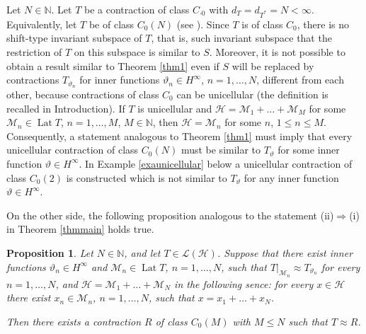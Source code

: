 \documentclass[a4paper,oneside,11pt]{amsart}
\numberwithin{equation}{section}
\theoremstyle{plain}
\newtheorem{proposition}[theorem]{Proposition}
\theoremstyle{definition}
\begin{document}
Let $N\in\mathbb N$. 
Let $T$ be a contraction of class  $C_{\cdot 0}$ with $d_T=d_{T^*}=N<\infty$. 
Equivalently, let $T$ be of class $C_0(N)$ (see \cite{sznf74}). 
Since $T$ is of class $C_0$, 
there is no shift-type invariant subspace of $T$, that is, such invariant subspace that the restriction of  $T$ on 
this subspace is similar to $S$. 
Moreover, it is not possible to obtain a result similar to Theorem \ref{thm1}  even if $S$ will be replaced by 
contractions $T_{\vartheta_n}$ for inner functions $\vartheta_n\in H^\infty$,   $n=1,\ldots, N$, different from each other, 
because contractions of class $C_0$ can be unicellular (the definition is recalled in Introduction). 
 If $T$ is unicellular and 
 $\mathcal H=\mathcal M_1+\ldots+\mathcal M_M$ for some $\mathcal M_n\in\operatorname{Lat}T$, $n=1,\ldots, M$, 
 $M\in\mathbb N$,
then $\mathcal H=\mathcal M_n$ for some $n$, $1\leq n\leq M$. Consequently, a statement  analogous  to Theorem \ref{thm1} must imply that 
every unicellular contraction of class $C_0(N)$ must be similar to $T_\vartheta$ for some inner function $\vartheta\in H^\infty$. 
In Example \ref{exaunicellular} below a unicellular contraction of class $C_0(2)$ is constructed which is not similar to 
 $T_\vartheta$ for any inner function $\vartheta\in H^\infty$. 

On the other side, the following proposition analogous to the statement (ii)$\Rightarrow$(i) in Theorem \ref{thmmain} holds true. 

\begin{proposition}\label{propc0} Let  $N\in\mathbb N$, and let $T\in\mathcal L(\mathcal H)$.
 Suppose that there exist  inner functions $\vartheta_n\in H^\infty$ and $\mathcal M_n\in\operatorname{Lat}T$, $n=1,\ldots, N$, 
such that $T|_{\mathcal M_n}\approx T_{\vartheta_n}$ for every  $n=1,\ldots, N$, and 
$\mathcal H=\mathcal M_1+\ldots+\mathcal M_N$ in the following sence: for every $x\in\mathcal H$ there exist 
  $x_n\in\mathcal M_n$, $n=1,\ldots, N$, such that $x=x_1+\ldots+x_N$.

Then there exists a contraction $R$ of class $C_0(M)$ with $M\leq N$ such that $T\approx R$. 
\end{proposition}
\end{document}
